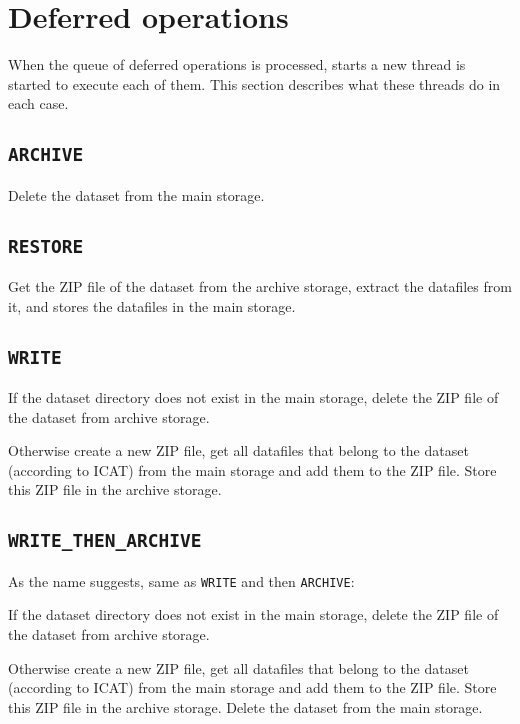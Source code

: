 \documentclass[paper=a4]{scrartcl}
\begin{document}
\section{Deferred operations}
\label{sec:defops}

When the queue of deferred operations is processed, starts a new
thread is started to execute each of them.  This section describes
what these threads do in each case.

\subsection{\texttt{ARCHIVE}}

Delete the dataset from the main storage.

\subsection{\texttt{RESTORE}}

Get the ZIP file of the dataset from the archive storage, extract the
datafiles from it, and stores the datafiles in the main storage.

\subsection{\texttt{WRITE}}

If the dataset directory does not exist in the main storage, delete
the ZIP file of the dataset from archive storage.

Otherwise create a new ZIP file, get all datafiles that belong to the
dataset (according to ICAT) from the main storage and add them to the
ZIP file.  Store this ZIP file in the archive storage.

\subsection{\texttt{WRITE\_THEN\_ARCHIVE}}

As the name suggests, same as \texttt{WRITE} and then
\texttt{ARCHIVE}:

If the dataset directory does not exist in the main storage, delete
the ZIP file of the dataset from archive storage.

Otherwise create a new ZIP file, get all datafiles that belong to the
dataset (according to ICAT) from the main storage and add them to the
ZIP file.  Store this ZIP file in the archive storage.  Delete the
dataset from the main storage.
\end{document}
